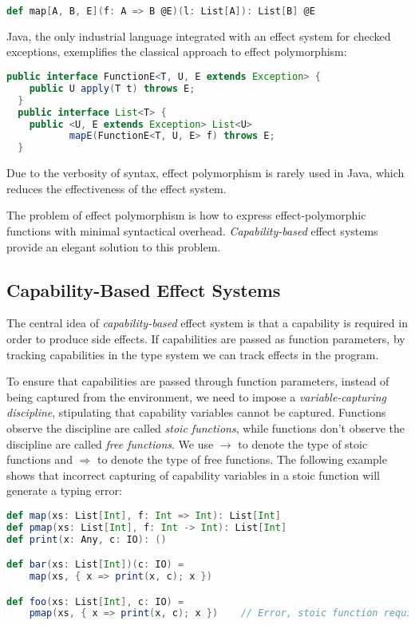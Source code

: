 \begin{lstlisting}[language=Scala]
def map[A, B, E](f: A => B @E)(l: List[A]): List[B] @E
\end{lstlisting}

Java, the only industrial language integrated with an effect system
for checked exceptions, exemplifies the classical approach to effect
polymorphism:

\begin{lstlisting}[language=Java]
  public interface FunctionE<T, U, E extends Exception> {
    public U apply(T t) throws E;
  }
  public interface List<T> {
    public <U, E extends Exception> List<U>
           mapE(FunctionE<T, U, E> f) throws E;
  }
\end{lstlisting}

Due to the verbosity of syntax, effect polymorphism is rarely used in
Java, which reduces the effectiveness of the effect system.

The problem of effect polymorphism is how to express
effect-polymorphic functions with minimal syntactical overhead.
\emph{Capability-based} effect systems provide an elegant solution to
this problem.

\subsection{Capability-Based Effect Systems}

The central idea of \emph{capability-based} effect system is that a
capability is required in order to produce side effects. If
capabilities are passed as function parameters, by tracking
capabilities in the type system we can track effects in the program.

To ensure that capabilities are passed through function parameters,
instead of being captured from the environment, we need to impose a
\emph{variable-capturing discipline}, stipulating that capability
variables cannot be captured. Functions observe the discipline are
called \emph{stoic functions}, while functions don't observe the
discipline are called \emph{free functions}. We use $\to$ to denote
the type of stoic functions and $\Rightarrow$ to denote the type of
free functions. The following example shows that incorrect capturing
of capability variables in a stoic function will generate a typing
error:

\begin{lstlisting}[language=Scala]
def map(xs: List[Int], f: Int => Int): List[Int]
def pmap(xs: List[Int], f: Int -> Int): List[Int]
def print(x: Any, c: IO): ()

def bar(xs: List[Int])(c: IO) =
    map(xs, { x => print(x, c); x })

def foo(xs: List[Int], c: IO) =
    pmap(xs, { x => print(x, c); x })    // Error, stoic function required
\end{lstlisting}

